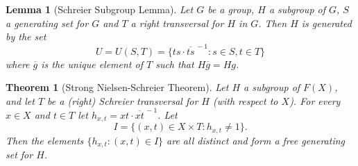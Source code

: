 \documentclass[12pt,letterpaper]{article}
\newtheorem{Lemma}{Lemma}[]
\newtheorem{Theorem}{Theorem}[]
\theoremstyle{remark}
\begin{document}
\begin{Lemma}[Schreier Subgroup Lemma] Let $G$ be a group, $H$ a subgroup of $G$, $S$ a generating set for $G$ and $T$ a right transversal for $H$ in $G$.
Then $H$ is generated by the set
$$U=U(S,T)=\{ts\cdot{\overline{ts}}^{\,-1}: s\in S, t\in T\}$$
where $\overline g$ is the unique element of $T$ such that $H\overline g=Hg$.
\end{Lemma}


\begin{Theorem}[Strong Nielsen-Schreier Theorem] Let $H$ a subgroup of $F(X)$, and let $T$ be a (right) Schreier transversal for $H$ (with respect to $X$). For every $x\in X$ and $t\in T$ let $h_{x,t}=xt\cdot {\overline{xt}}^{\,-1}$.
Let $$I=\{(x,t)\in X\times T: h_{x,t}\neq 1\}.$$ Then the elements $\{h_{x,t}: (x,t)\in I\}$ are all distinct and form a free 
generating set for $H$.
\end{Theorem}
\end{document}

